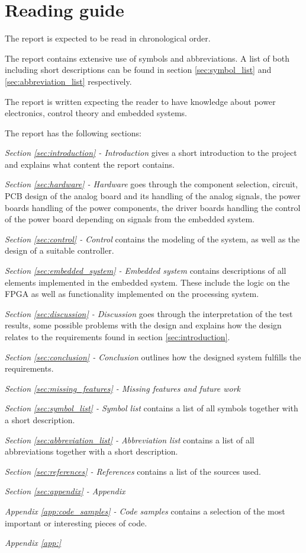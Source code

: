 \section{Reading guide}
The report is expected to be read in chronological order. 

The report contains extensive use of symbols and abbreviations. A list of both including short descriptions can be found in section \ref{sec:symbol_list} and \ref{sec:abbreviation_list} respectively. 

The report is written expecting the reader to have knowledge about power electronics, control theory and embedded systems.

\medskip
The report has the following sections:

\medskip
\emph{Section \ref{sec:introduction} - Introduction} gives a short introduction to the project and explains what content the report contains.

\medskip
\emph{Section \ref{sec:hardware} - Hardware} goes through the component selection, circuit, PCB design of the analog board and its handling of the analog signals, the power boards handling of the power components, the driver boards handling the control of the power board depending on signals from the embedded system.

\medskip
\emph{Section \ref{sec:control} - Control} contains the modeling of the system, as well as the design of a suitable controller. 

\medskip
\emph{Section \ref{sec:embedded_system} - Embedded system} contains descriptions of all elements implemented in the embedded system. These include the logic on the FPGA as well as functionality implemented on the processing system. 

\medskip
\emph{Section \ref{sec:discussion} - Discussion} goes through the interpretation of the test results, some possible problems with the design and explains how the design relates to the requirements found in section \ref{sec:introduction}.

\medskip
\emph{Section \ref{sec:conclusion} - Conclusion} outlines how the designed system fulfills the requirements.

\medskip
\emph{Section \ref{sec:missing_features} - Missing features and future work} 

\medskip
\emph{Section \ref{sec:symbol_list} - Symbol list} contains a list of all symbols together with a short description.

\medskip
\emph{Section \ref{sec:abbreviation_list} - Abbreviation list} contains a list of all abbreviations together with a short description.

\medskip
\emph{Section \ref{sec:references} - References} contains a list of the sources used.


\medskip
\emph{Section \ref{sec:appendix} - Appendix} 

\quad \textit{Appendix \ref{app:code_samples} - Code samples} contains a selection of the most important or interesting pieces of code.

\quad \textit{Appendix \ref{app:}} 
